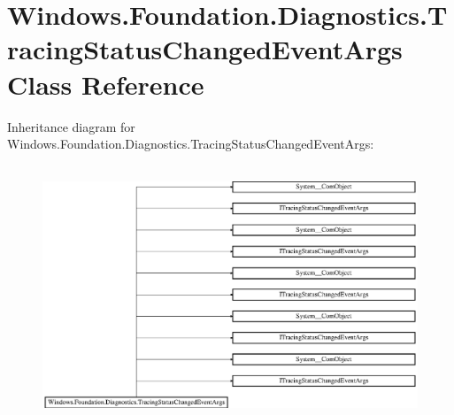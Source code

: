 \hypertarget{class_windows_1_1_foundation_1_1_diagnostics_1_1_tracing_status_changed_event_args}{}\section{Windows.\+Foundation.\+Diagnostics.\+Tracing\+Status\+Changed\+Event\+Args Class Reference}
\label{class_windows_1_1_foundation_1_1_diagnostics_1_1_tracing_status_changed_event_args}
Inheritance diagram for Windows.\+Foundation.\+Diagnostics.\+Tracing\+Status\+Changed\+Event\+Args\+:\begin{figure}[H]
\begin{center}
\leavevmode
\includegraphics[height=7.758186cm]{class_windows_1_1_foundation_1_1_diagnostics_1_1_tracing_status_changed_event_args}
\end{center}
\end{figure}
